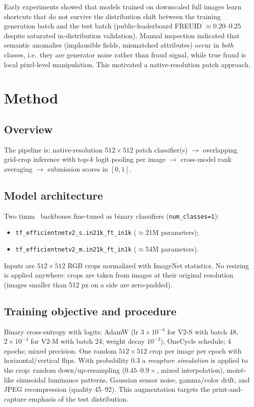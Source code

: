 \documentclass[11pt,a4paper]{article}
\begin{document}
Early experiments showed that models trained on downscaled full images learn
shortcuts that do not survive the distribution shift between the training generation
batch and the test batch (public-leaderboard FREUID $\approx 0.20$--$0.25$ despite
saturated in-distribution validation). Manual inspection indicated that semantic
anomalies (implausible fields, mismatched attributes) occur in \emph{both} classes,
i.e.\ they are generator noise rather than fraud signal, while true fraud is local
pixel-level manipulation. This motivated a native-resolution patch approach.

\section{Method}
\label{sec:method}

\subsection{Overview}
The pipeline is: native-resolution $512\times512$ patch classifier(s)
$\rightarrow$ overlapping grid-crop inference with top-$k$ logit pooling per image
$\rightarrow$ cross-model rank averaging $\rightarrow$ submission scores in $[0,1]$.

\subsection{Model architecture}
Two timm~\cite{timm} backbones fine-tuned as binary classifiers
(\texttt{num\_classes=1}):
\begin{itemize}[noitemsep]
  \item \texttt{tf\_efficientnetv2\_s.in21k\_ft\_in1k} ($\approx$21M parameters);
  \item \texttt{tf\_efficientnetv2\_m.in21k\_ft\_in1k} ($\approx$54M parameters).
\end{itemize}
Inputs are $512\times512$ RGB crops normalized with ImageNet statistics. No resizing
is applied anywhere: crops are taken from images at their original resolution
(images smaller than 512 px on a side are zero-padded).

\subsection{Training objective and procedure}
Binary cross-entropy with logits; AdamW (lr $3\times10^{-4}$ for V2-S with batch 48,
$2\times10^{-4}$ for V2-M with batch 24; weight decay $10^{-2}$); OneCycle schedule;
4 epochs; mixed precision. One random $512\times512$ crop per image per epoch with
horizontal/vertical flips. With probability $0.3$ a \emph{recapture simulation} is
applied to the crop: random down/up-resampling ($0.45$--$0.9\times$, mixed
interpolation), moir\'e-like sinusoidal luminance patterns, Gaussian sensor noise,
gamma/color drift, and JPEG recompression (quality 45--92). This augmentation targets
the print-and-capture emphasis of the test distribution.
\end{document}

